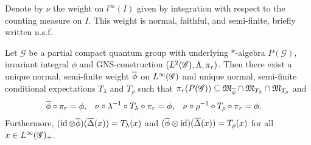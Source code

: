 Denote by $\nu$ the weight on $l^{\infty}(I)$ given by
integration with respect to the counting measure on $I$. This weight is
normal, faithful, and semi-finite,  briefly written n.s.f.\
\begin{Prop} \label{prop:vn-phi} Let $\mathscr{G}$ be a partial
  compact quantum group with underlying $*$-algebra $P(\mathscr{G})$,
  invariant integral $\phi$ and GNS-construction
  $(L^{2}(\mathscr{G}),\Lambda,\pi_{r})$. Then there exist a unique normal,
  semi-finite weight $\overline{\phi}$ on $L^{\infty}(\mathscr{G})$ and unique normal, semi-finite
  conditional expectations $T_{\lambda}$ and $T_{\rho}$ such that
  $\pi_{r}(P(\mathscr{G})) \subseteq
  \mathfrak{M}_{\overline{\phi}} \cap   \mathfrak{M}_{T_{\lambda}} \cap
  \mathfrak{M}_{T_{\rho}}$ and 
  \begin{align*}
\overline{\phi} \circ \pi_{r} &= \phi,&
\nu \circ
  \lambda^{-1} \circ T_{\lambda} \circ \pi_{r}   &= \phi, &  \nu \circ \rho^{-1} \circ
  T_{\rho} \circ\pi_{r} &= \phi.
  \end{align*}
Furthermore,  $(\operatorname{id} \otimes \overline{\phi})(\overline{\Delta}(x)) =  T_{\lambda}(x)$ and $
    (\overline{\phi} \otimes \operatorname{id})(\overline{\Delta}(x)) = T_{\rho}(x)$ 
 for all
  $x\in L^{\infty}(\mathscr{G})_{+}$.
\end{Prop}

